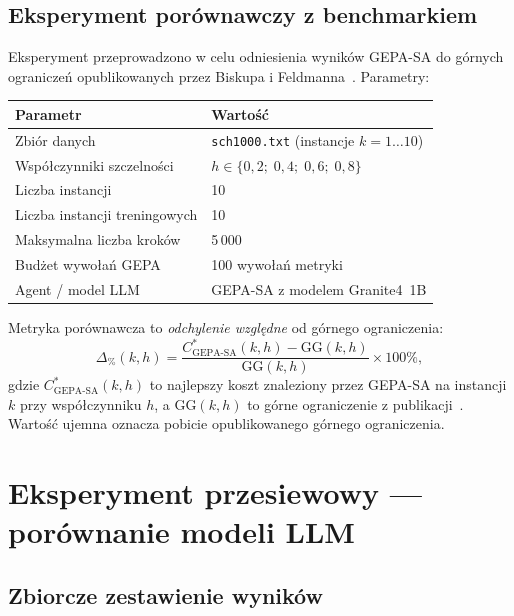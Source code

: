 \documentclass[11pt,a4paper]{article}
\begin{document}
\subsection{Eksperyment porównawczy z benchmarkiem}

Eksperyment przeprowadzono w celu odniesienia wyników GEPA-SA do
górnych ograniczeń opublikowanych przez Biskupa i Feldmanna~\cite{biskup2001}.
Parametry:

\begin{center}
\begin{tabular}{@{}ll@{}}
\toprule
\textbf{Parametr} & \textbf{Wartość} \\
\midrule
Zbiór danych              & \texttt{sch1000.txt} (instancje $k = 1\ldots10$) \\
Współczynniki szczelności & $h \in \{0{,}2;\; 0{,}4;\; 0{,}6;\; 0{,}8\}$ \\
Liczba instancji          & 10 \\
Liczba instancji treningowych & 10 \\
Maksymalna liczba kroków  & 5\,000 \\
Budżet wywołań GEPA       & 100 wywołań metryki \\
Agent / model LLM         & GEPA-SA z modelem Granite4~1B \\
\bottomrule
\end{tabular}
\end{center}

Metryka porównawcza to \emph{odchylenie względne} od górnego ograniczenia:
\begin{equation}
  \Delta_{\%}(k, h) = \frac{C^*_{\text{GEPA-SA}}(k, h) - \text{GG}(k, h)}
                           {\text{GG}(k, h)} \times 100\%,
  \label{eq:gap}
\end{equation}
gdzie $C^*_{\text{GEPA-SA}}(k,h)$ to najlepszy koszt znaleziony przez GEPA-SA
na instancji $k$ przy współczynniku $h$, a $\text{GG}(k,h)$ to górne
ograniczenie z publikacji~\cite{biskup2001}.
Wartość ujemna oznacza pobicie opublikowanego górnego ograniczenia.

\section{Eksperyment przesiewowy — porównanie modeli LLM}

\subsection{Zbiorcze zestawienie wyników}
\end{document}
